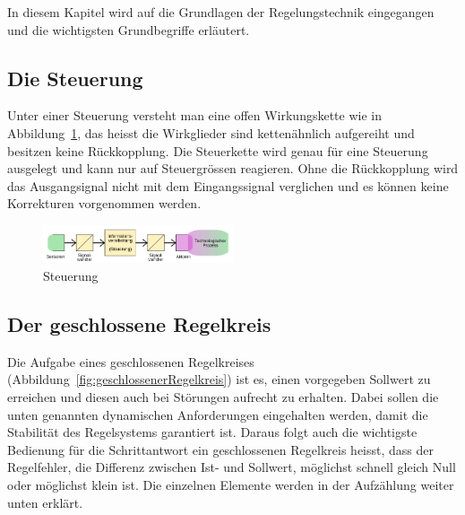 In diesem Kapitel wird auf die Grundlagen der Regelungstechnik eingegangen und
die wichtigsten Grundbegriffe erl\"autert.

\subsection{Die Steuerung}

Unter  einer   Steuerung  versteht  man   eine  offen  Wirkungskette   wie  in
Abbildung~\ref{fig:Steuerung}, das heisst die Wirkglieder sind ketten\"ahnlich
aufgereiht und besitzen keine R\"uckkopplung. Die Steuerkette wird genau f\"ur
eine Steuerung ausgelegt und kann  nur auf Steuergr\"ossen reagieren. Ohne die
R\"uckkopplung wird das Ausgangsignal  nicht mit dem Eingangssignal verglichen
und es k\"onnen keine Korrekturen vorgenommen werden.

\begin{figure}[!h!, width=\pagewidth]
    \centering
    \includegraphics[width=0.5\textwidth]{images/Steuerung}
    \caption{Steuerung}
    \label{fig:Steuerung}
\end{figure}


\subsection{Der geschlossene Regelkreis}
\label{subs:grundl:geschlossenerRegelkreis}
Die          Aufgabe         eines          geschlossenen         Regelkreises
(Abbildung~\ref{fig:geschlossenerRegelkreis})   ist   es,   einen   vorgegeben
Sollwert  zu   erreichen  und   diesen  auch   bei  St\"orungen   aufrecht  zu
erhalten. Dabei   sollen  die   unten   genannten  dynamischen   Anforderungen
eingehalten  werden,  damit  die   Stabilit\"at  des  Regelsystems  garantiert
ist. Daraus folgt auch  die wichtigste Bedienung f\"ur  die Schrittantwort ein
geschlossenen Regelkreis heisst, dass  der Regelfehler, die Differenz zwischen
Ist-  und Sollwert,  m\"oglichst schnell  gleich Null  oder m\"oglichst  klein
ist. Die einzelnen Elemente werden in der Aufz\"ahlung weiter unten erkl\"art.


